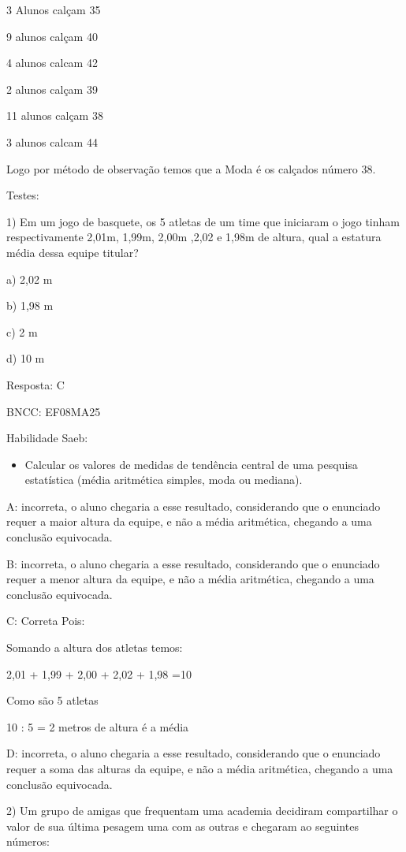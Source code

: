 3 Alunos calçam 35

9 alunos calçam 40

4 alunos calcam 42

2 alunos calçam 39

11 alunos calçam 38

3 alunos calcam 44

Logo por método de observação temos que a Moda é os calçados número 38.

Testes:

1) Em um jogo de basquete, os 5 atletas de um time que iniciaram o jogo
tinham respectivamente 2,01m, 1,99m, 2,00m ,2,02 e 1,98m de altura, qual
a estatura média dessa equipe titular?

a) 2,02 m

b) 1,98 m

c) 2 m

d) 10 m

Resposta: C

BNCC: EF08MA25

Habilidade Saeb:

\begin{itemize}
\tightlist
\item
  Calcular os valores de medidas de tendência central de uma pesquisa
  estatística (média aritmética simples, moda ou mediana).
\end{itemize}

A: incorreta, o aluno chegaria a esse resultado, considerando que o
enunciado requer a maior altura da equipe, e não a média aritmética,
chegando a uma conclusão equivocada.

B: incorreta, o aluno chegaria a esse resultado, considerando que o
enunciado requer a menor altura da equipe, e não a média aritmética,
chegando a uma conclusão equivocada.

C: Correta Pois:

Somando a altura dos atletas temos:

2,01 + 1,99 + 2,00 + 2,02 + 1,98 =10

Como são 5 atletas

10 : 5 = 2 metros de altura é a média

D: incorreta, o aluno chegaria a esse resultado, considerando que o
enunciado requer a soma das alturas da equipe, e não a média aritmética,
chegando a uma conclusão equivocada.

2) Um grupo de amigas que frequentam uma academia decidiram compartilhar
o valor de sua última pesagem uma com as outras e chegaram ao seguintes
números:

